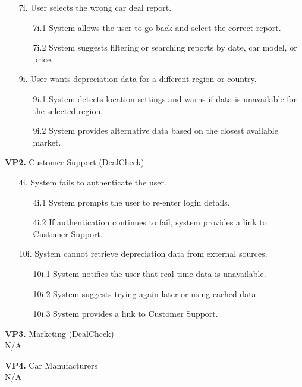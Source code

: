 \documentclass[]{article}
\begin{document}
\begin{enumerate}[{\bf {BE}1.}]
\begin{enumerate}
			\item[7i.] User selects the wrong car deal report.
			\begin{enumerate}
				\item[7i.1] System allows the user to go back and select the correct report.
				\item[7i.2] System suggests filtering or searching reports by date, car model, or price.
			\end{enumerate}
			
			\item[9i.] User wants depreciation data for a different region or country.
			\begin{enumerate}
				\item[9i.1] System detects location settings and warns if data is unavailable for the selected region.
				\item[9i.2] System provides alternative data based on the closest available market.
			\end{enumerate}
		\end{enumerate}  
		
		\textbf{VP2.} Customer Support (DealCheck)

		\begin{enumerate}
			\item[4i.] System fails to authenticate the user.
			\begin{enumerate}
				\item[4i.1] System prompts the user to re-enter login details.
				\item[4i.2] If authentication continues to fail, system provides a link to Customer Support.
			\end{enumerate}

			\item[10i.] System cannot retrieve depreciation data from external sources.
			\begin{enumerate}
				\item[10i.1] System notifies the user that real-time data is unavailable.
				\item[10i.2] System suggests trying again later or using cached data.
				\item[10i.3] System provides a link to Customer Support.
			\end{enumerate}
		\end{enumerate}

		\textbf{VP3.} Marketing (DealCheck) \\ N/A  

		\textbf{VP4.} Car Manufacturers \\ N/A  


\end{enumerate}
\end{document}

